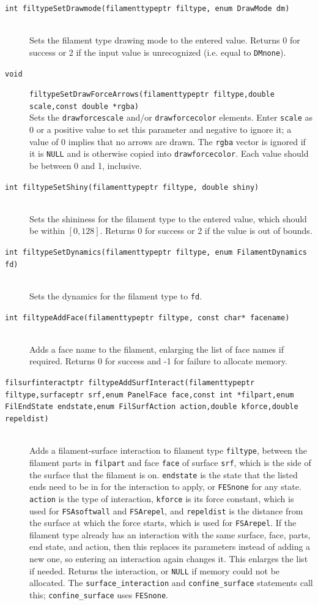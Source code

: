\documentclass {scrbook}
\newcommand {\ttt} {\texttt}
\begin{document}
\begin{description}
\item[\ttt{int filtypeSetDrawmode(filamenttypeptr filtype, enum DrawMode dm)}]
\hfill \\
Sets the filament type drawing mode to the entered value. Returns 0 for success or 2 if the input value is unrecognized (i.e. equal to \ttt{DMnone}).

\item[\ttt{void}]
\ttt{filtypeSetDrawForceArrows(filamenttypeptr filtype,double scale,const double *rgba)}
\hfill \\
Sets the \ttt{drawforcescale} and/or \ttt{drawforcecolor} elements. Enter \ttt{scale} as 0 or a positive value to set this parameter and negative to ignore it; a value of 0 implies that no arrows are drawn. The \ttt{rgba} vector is ignored if it is \ttt{NULL} and is otherwise copied into \ttt{drawforcecolor}. Each value should be between 0 and 1, inclusive.

\item[\ttt{int filtypeSetShiny(filamenttypeptr filtype, double shiny)}]
\hfill \\
Sets the shininess for the filament type to the entered value, which should be within $[0,128]$. Returns 0 for success or 2 if the value is out of bounds.

\item[\ttt{int filtypeSetDynamics(filamenttypeptr filtype, enum FilamentDynamics fd)}]
\hfill \\
Sets the dynamics for the filament type to \ttt{fd}.

\item[\ttt{int filtypeAddFace(filamenttypeptr filtype, const char* facename)}]
\hfill \\
Adds a face name to the filament, enlarging the list of face names if required. Returns 0 for success and -1 for failure to allocate memory.

\item[\ttt{filsurfinteractptr filtypeAddSurfInteract(filamenttypeptr filtype,surfaceptr srf,enum PanelFace face,const int *filpart,enum FilEndState endstate,enum FilSurfAction action,double kforce,double repeldist)}] %
\hfill \\
Adds a filament-surface interaction to filament type \ttt{filtype}, between the filament parts in \ttt{filpart} and face \ttt{face} of surface \ttt{srf}, which is the side of the surface that the filament is on. \ttt{endstate} is the state that the listed ends need to be in for the interaction to apply, or \ttt{FESnone} for any state. \ttt{action} is the type of interaction, \ttt{kforce} is its force constant, which is used for \ttt{FSAsoftwall} and \ttt{FSArepel}, and \ttt{repeldist} is the distance from the surface at which the force starts, which is used for \ttt{FSArepel}. If the filament type already has an interaction with the same surface, face, parts, end state, and action, then this replaces its parameters instead of adding a new one, so entering an interaction again changes it. This enlarges the list if needed. Returns the interaction, or \ttt{NULL} if memory could not be allocated. The \ttt{surface\_interaction} and \ttt{confine\_surface} statements call this; \ttt{confine\_surface} uses \ttt{FESnone}.


\end{description}
\end{document}
